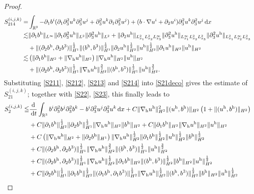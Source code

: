 \documentclass[11pt]{amsart}
\theoremstyle{definition}
\newcommand{\R}{\mathbb{R}}
\newcommand{\h}{\mathrm{h}}
\newcommand{\dx}{\,{\rm d}x}
\newcommand{\dt}{\,{\rm d}t}
\newcommand{\nablah}{\nabla_{\mathrm{h}}}
\numberwithin{equation}{section}
\begin{document}
\begin{proof}
	\begin{align}\label{S214}
		S^{(i,j,k)}_{214}=&\int_{\R^3}-\partial_1b^i(\partial_1\partial_3^2u^k\partial_3^2u^j+\partial_3^2u^k\partial_1\partial_3^2u^j)+(b\cdot\nabla u^i+\partial_2u^i)\partial_3^2u^k\partial_3^2u^j\dx\nonumber\\
		\lesssim&\|\partial_1b^\h\|_{L^\infty}\|\partial_1\partial_3^2u^\h\|_{L^2}\|\partial_3^2u^\h\|_{L^2}+\|\partial_2u^\h\|_{L^2_{x_1}L^2_{x_2}L^\infty_{x_3}}\|\partial_3^2u^\h\|_{L^\infty_{x_1}L^2_{x_2}L^2_{x_3}}\|\partial_3^2u^\h\|_{L^2_{x_1}L^\infty_{x_2}L^2_{x_3}}\nonumber\\
		&+\|(\partial_2b^\h,\partial_2b^3)\|_{H^1}^\frac12\|(b^\h,b^3)\|_{H^1}^\frac12\|\partial_2u^\h\|_{H^2}^\frac12\|u^\h\|_{H^2}^\frac12\|\partial_1u^\h\|_{H^2}\|u^\h\|_{H^2}\nonumber\\
		\lesssim&\left(\|\partial_1b^\h\|_{H^2}+\|\nablah u^\h\|_{H^2}\right)\|\nablah u^\h\|_{H^2}\|u^\h\|_{H^2}\nonumber\\
		&+\|(\partial_2b^\h,\partial_2b^3)\|_{H^1}^\frac12\|\nablah u^\h\|_{H^2}^\frac32\|(b^\h,b^3)\|_{H^1}^\frac12\|u^\h\|_{H^2}^\frac32.
	\end{align}
	Substituting \eqref{S211}, \eqref{S212}, \eqref{S213} and \eqref{S214} into \eqref{S21deco} gives the estimate of $S^{(i,j,k)}_{21}$; together with \eqref{S22}, \eqref{S23}, this finally leads to
	\begin{align*}
		S^{(i,j,k)}_{2}\leqq&\frac{\mathrm{d}}{\dt}\int_{\R^3} b^i\partial_3^2b^j\partial_3^2b^k-b^i\partial_3^2u^j\partial_3^2u^k\dx+C\|\nablah u^\h\|_{H^2}^2\|(u^\h,b^\h)\|_{H^2}\left(1+\|(u^\h,b^\h)\|_{H^2}\right)\nonumber\\
		&+C\|\partial_1b^\h\|_{H^2}^\frac12\|\partial_2b^\h\|_{H^1}^\frac12\|\nablah u^\h\|_{H^2}\|b^\h\|_{H^2}+C\|\partial_1b^\h\|_{H^2}\|\nablah u^\h\|_{H^2}\|u^\h\|_{H^2}\nonumber\\
		&+C\left(\|\nablah u^\h\|_{H^2}+\|\partial_2b^\h\|_{H^1}\right)\|\nablah u^\h\|_{H^2}^\frac12\|\partial_1b^\h\|_{H^2}^\frac12\| u^\h\|_{H^2}^\frac12  \| b^\h\|_{H^2}^\frac12\nonumber\\
		&+C\|(\partial_2b^\h,\partial_2b^3)\|_{H^1}^\frac12\|\nablah u^\h\|_{H^2}^\frac32\|(b^\h,b^3)\|_{H^1}^\frac12\|u^\h\|_{H^2}^\frac32\nonumber\\
		&+C\|(\partial_2b^\h,\partial_2b^3)\|_{H^1}^\frac12\|\nablah u^\h\|_{H^2}^\frac12\|\partial_1b^\h\|_{H^2}\|(b^\h,b^3)\|_{H^2}^\frac12\|b^\h\|_{H^2}\|u^\h\|_{H^2}^\frac12\nonumber\\
		&+C\|\partial_2b^\h\|_{H^1}^\frac12\|\partial_1b^\h\|_{H^2}^\frac12\|(\partial_1b^\h,\partial_1b^3)\|_{H^2}^\frac12\|\nablah u^\h\|_{H^2}^\frac12\|(b^\h,b^3)\|_{H^2}^\frac12\|b^\h\|_{H^2}\|u^\h\|_{H^2}^\frac12\nonumber\\

\end{align*}
\end{proof}
\end{document}
